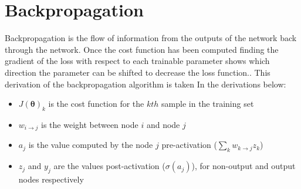 \documentclass[12pt,a4paper,twoside,openright]{report}
\renewcommand{\vec}[1]{\bm{#1}}
\begin{document}


\printbibliography







\newpage

\appendix

\chapter{Backpropagation} \label{backprop}

Backpropagation is the flow of information from the outputs of the network back through the network. Once the cost function has been computed
finding the gradient of the loss with respect to each trainable parameter shows which direction the parameter can be shifted to decrease 
the loss function.. This derivation of the backpropagation algorithm is taken  In the derivations below:
\begin{itemize}
  \item $J(\vec{\theta})_k$ is the cost function for the $kth$ sample in the training set
  \item $w_{i \to j}$ is the weight between node $i$ and node $j$
  \item $a_j$ is the value computed by the node $j$ pre-activation ($\sum_{k} w_{k \to j} z_k$)
  \item $z_j$ and $y_j$ are the values post-activation ($\sigma(a_j)$), for non-output and output nodes respectively
\end{itemize}
\end{document}
